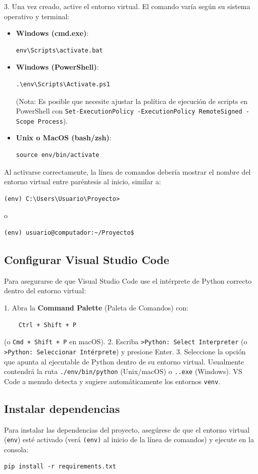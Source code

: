 3.  Una vez creado, active el entorno virtual. El comando varía según su sistema operativo y terminal:
    \begin{itemize}
        \item \textbf{Windows (cmd.exe)}:
        \begin{verbatim}
env\Scripts\activate.bat
        \end{verbatim}
        \item \textbf{Windows (PowerShell)}:
        \begin{verbatim}
.\env\Scripts\Activate.ps1 
        \end{verbatim}
        (Nota: Es posible que necesite ajustar la política de ejecución de scripts en PowerShell con \texttt{Set-ExecutionPolicy -ExecutionPolicy RemoteSigned -Scope Process}).
        \item \textbf{Unix o MacOS (bash/zsh)}:
        \begin{verbatim}
source env/bin/activate
        \end{verbatim}
    \end{itemize}

Al activarse correctamente, la línea de comandos debería mostrar el nombre del entorno virtual entre paréntesis al inicio, similar a:

\begin{verbatim}
(env) C:\Users\Usuario\Proyecto>
\end{verbatim}
o
\begin{verbatim}
(env) usuario@computador:~/Proyecto$ 
\end{verbatim}


\subsection{Configurar Visual Studio Code}

Para asegurarse de que Visual Studio Code use el intérprete de Python correcto dentro del entorno virtual:

1.  Abra la \textbf{Command Palette} (Paleta de Comandos) con:
    \begin{verbatim}
    Ctrl + Shift + P 
    \end{verbatim}
    (o \texttt{Cmd + Shift + P} en macOS).
2.  Escriba \texttt{>Python: Select Interpreter} (o \texttt{>Python: Seleccionar Intérprete}) y presione Enter.
3.  Seleccione la opción que apunta al ejecutable de Python dentro de su entorno virtual. Usualmente contendrá la ruta \texttt{./env/bin/python} (Unix/macOS) o \texttt{.\env\Scripts\python.exe} (Windows). VS Code a menudo detecta y sugiere automáticamente los entornos \texttt{venv}.

\subsection{Instalar dependencias}
\label{sec:instalar_dependencias}

Para instalar las dependencias del proyecto, asegúrese de que el entorno virtual (\texttt{env}) esté activado (verá \texttt{(env)} al inicio de la línea de comandos) y ejecute en la consola:

\begin{verbatim}
pip install -r requirements.txt
\end{verbatim}